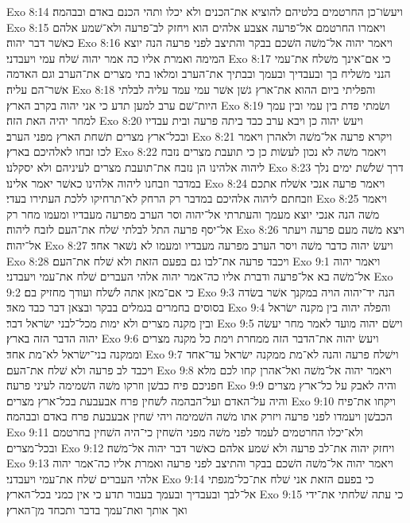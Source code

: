 Exo 8:14  ויעשׂו־כן החרטמים בלטיהם להוציא את־הכנים ולא יכלו ותהי הכנם באדם ובבהמה׃
Exo 8:15  ויאמרו החרטמם אל־פרעה אצבע אלהים הוא ויחזק לב־פרעה ולא־שׁמע אלהם כאשׁר דבר יהוה׃
Exo 8:16  ויאמר יהוה אל־משׁה השׁכם בבקר והתיצב לפני פרעה הנה יוצא המימה ואמרת אליו כה אמר יהוה שׁלח עמי ויעבדני׃
Exo 8:17  כי אם־אינך משׁלח את־עמי הנני משׁליח בך ובעבדיך ובעמך ובבתיך את־הערב ומלאו בתי מצרים את־הערב וגם האדמה אשׁר־הם עליה׃
Exo 8:18  והפליתי ביום ההוא את־ארץ גשׁן אשׁר עמי עמד עליה לבלתי היות־שׁם ערב למען תדע כי אני יהוה בקרב הארץ׃
Exo 8:19  ושׂמתי פדת בין עמי ובין עמך למחר יהיה האת הזה׃
Exo 8:20  ויעשׂ יהוה כן ויבא ערב כבד ביתה פרעה ובית עבדיו ובכל־ארץ מצרים תשׁחת הארץ מפני הערב׃
Exo 8:21  ויקרא פרעה אל־משׁה ולאהרן ויאמר לכו זבחו לאלהיכם בארץ׃
Exo 8:22  ויאמר משׁה לא נכון לעשׂות כן כי תועבת מצרים נזבח ליהוה אלהינו הן נזבח את־תועבת מצרים לעיניהם ולא יסקלנו׃
Exo 8:23  דרך שׁלשׁת ימים נלך במדבר וזבחנו ליהוה אלהינו כאשׁר יאמר אלינו׃
Exo 8:24  ויאמר פרעה אנכי אשׁלח אתכם וזבחתם ליהוה אלהיכם במדבר רק הרחק לא־תרחיקו ללכת העתירו בעדי׃
Exo 8:25  ויאמר משׁה הנה אנכי יוצא מעמך והעתרתי אל־יהוה וסר הערב מפרעה מעבדיו ומעמו מחר רק אל־יסף פרעה התל לבלתי שׁלח את־העם לזבח ליהוה׃
Exo 8:26  ויצא משׁה מעם פרעה ויעתר אל־יהוה׃
Exo 8:27  ויעשׂ יהוה כדבר משׁה ויסר הערב מפרעה מעבדיו ומעמו לא נשׁאר אחד׃
Exo 8:28  ויכבד פרעה את־לבו גם בפעם הזאת ולא שׁלח את־העם׃
Exo 9:1  ויאמר יהוה אל־משׁה בא אל־פרעה ודברת אליו כה־אמר יהוה אלהי העברים שׁלח את־עמי ויעבדני׃
Exo 9:2  כי אם־מאן אתה לשׁלח ועודך מחזיק בם׃
Exo 9:3  הנה יד־יהוה הויה במקנך אשׁר בשׂדה בסוסים בחמרים בגמלים בבקר ובצאן דבר כבד מאד׃
Exo 9:4  והפלה יהוה בין מקנה ישׂראל ובין מקנה מצרים ולא ימות מכל־לבני ישׂראל דבר׃
Exo 9:5  וישׂם יהוה מועד לאמר מחר יעשׂה יהוה הדבר הזה בארץ׃
Exo 9:6  ויעשׂ יהוה את־הדבר הזה ממחרת וימת כל מקנה מצרים וממקנה בני־ישׂראל לא־מת אחד׃
Exo 9:7  וישׁלח פרעה והנה לא־מת ממקנה ישׂראל עד־אחד ויכבד לב פרעה ולא שׁלח את־העם׃
Exo 9:8  ויאמר יהוה אל־משׁה ואל־אהרן קחו לכם מלא חפניכם פיח כבשׁן וזרקו משׁה השׁמימה לעיני פרעה׃
Exo 9:9  והיה לאבק על כל־ארץ מצרים והיה על־האדם ועל־הבהמה לשׁחין פרח אבעבעת בכל־ארץ מצרים׃
Exo 9:10  ויקחו את־פיח הכבשׁן ויעמדו לפני פרעה ויזרק אתו משׁה השׁמימה ויהי שׁחין אבעבעת פרח באדם ובבהמה׃
Exo 9:11  ולא־יכלו החרטמים לעמד לפני משׁה מפני השׁחין כי־היה השׁחין בחרטמם ובכל־מצרים׃
Exo 9:12  ויחזק יהוה את־לב פרעה ולא שׁמע אלהם כאשׁר דבר יהוה אל־משׁה׃
Exo 9:13  ויאמר יהוה אל־משׁה השׁכם בבקר והתיצב לפני פרעה ואמרת אליו כה־אמר יהוה אלהי העברים שׁלח את־עמי ויעבדני׃
Exo 9:14  כי בפעם הזאת אני שׁלח את־כל־מגפתי אל־לבך ובעבדיך ובעמך בעבור תדע כי אין כמני בכל־הארץ׃
Exo 9:15  כי עתה שׁלחתי את־ידי ואך אותך ואת־עמך בדבר ותכחד מן־הארץ׃
